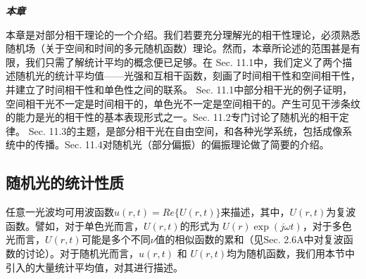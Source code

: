 \documentclass[UTF8]{ctexart}
\numberwithin{figure}{subsection}
\numberwithin{table}{subsection}
\begin{document}
\bigbreak\noindent\textcolor{ksc}{\textbf{\textsl{本章}}}
\par 本章是对部分相干理论的一个介绍。我们若要充分理解光的相干性理论，必须熟悉随机场（关于空间和时间的多元随机函数）理论。然而，本章所论述的范围甚是有限，我们只需了解统计平均的概念便已足够。在 Sec. 11.1中，我们定义了两个描述随机光的统计平均值——光强和互相干函数，刻画了时间相干性和空间相干性，并建立了时间相干性和单色性之间的联系。 Sec. 11.1中部分相干光的例子证明，空间相干光不一定是时间相干的，单色光不一定是空间相干的。产生可见干涉条纹的能力是光的相干性的基本表现形式之一。Sec. 11.2专门讨论了随机光的相干定律。 Sec. 11.3的主题，是部分相干光在自由空间，和各种光学系统，包括成像系统中的传播。Sec. 11.4对随机光（部分偏振）的偏振理论做了简要的介绍。

\bigbreak\begingroup
\color{ksc}
\subsection{随机光的统计性质}
\endgroup
任意一光波均可用波函数$ u(r,t) = Re\{U(r,t)\} $来描述，其中，$ U(r,t) $为复波函数。譬如，对于单色光而言，$ U(r,t) $的形式为 $ U(r)\exp(j\omega t)$，对于多色光而言，$ U(r,t) $可能是多个不同$\nu$值的相似函数的累和（见Sec. 2.6A中对复波函数的讨论）。对于随机光而言，$ u(r,t) $ 和 $ U(r,t) $均为随机函数，我们用本节中引入的大量统计平均值，对其进行描述。

\bigbreak\begingroup
\color{ksc}
\end{document}
